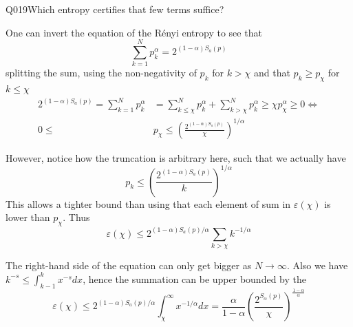 \begin{entry}{Q019}{Which entropy certifies that few terms suffice?}
\begin{solution}[a]
One can invert the equation of the Rényi entropy to see that 
\begin{equation}
    \sum_{k=1}^{N} p_k^{\alpha} = 2^{(1-\alpha)S_a(p)}
\end{equation}
splitting the sum, using the non-negativity of $p_k$ for $k>\chi$ and that $ p_k\geq p_\chi$ for $k \leq \chi$
\begin{equation}
\begin{split}
    2^{(1-\alpha)S_a(p)}=\sum_{k=1}^{N} p_k^{\alpha} &= \sum_{k \leq \chi}^{N} p_k^{\alpha} + \sum_{k >\chi}^{N} p_k^{\alpha} \geq \chi p_\chi^\alpha \geq 0 \iff \\
    0\leq &p_\chi \leq \left(\frac{2^{(1-\alpha)S_a(p)}}{\chi}\right)^{1/\alpha}
\end{split} 
\end{equation}

However, notice how the truncation is arbitrary here, such that we actually have 
\begin{equation*}
    p_k \leq \left(\frac{2^{(1-\alpha)S_a(p)}}{k}\right)^{1/\alpha}
\end{equation*}
This allows a tighter bound than using that each element of sum in $\varepsilon(\chi)$ is lower than $p_\chi$. Thus
\begin{equation}
    \varepsilon(\chi)\leq 2^{(1-\alpha)S_a(p)/\alpha} \sum_{k>\chi} k^{-1/\alpha}
\end{equation}

The right-hand side of the equation can only get bigger as $N\rightarrow \infty$. Also we have $k^{-s} \leq \int_{k-1}^k x^{-s} dx$, hence the summation can be upper bounded by the 
\begin{equation}
    \varepsilon(\chi) \leq  2^{(1-\alpha)S_a(p)/\alpha} \int_{\chi}^{\infty} x^{-1/\alpha}dx= \frac{\alpha}{1-\alpha}
          \left(\frac{2^{S_\alpha(p)}}{\chi}\right)^{\frac{1-\alpha}{\alpha}}
\end{equation}

\end{solution}

\begin{solution}[b]


\end{solution}
\end{entry}
